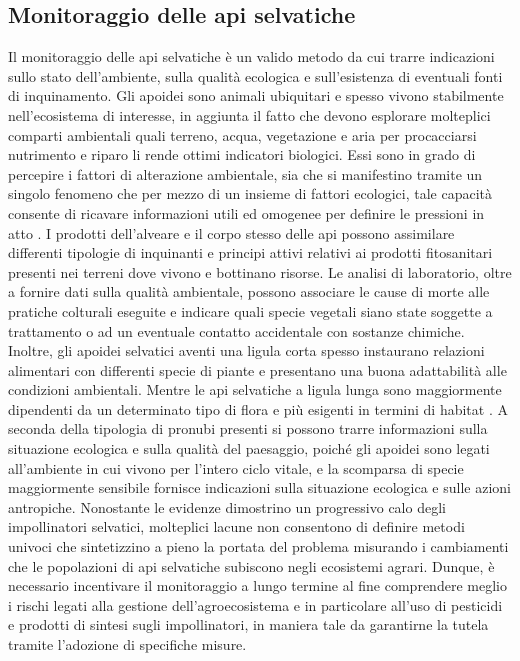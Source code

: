 \documentclass[main.tex]{subfiles}
\begin{document}
\subsection{Monitoraggio delle api selvatiche}

Il monitoraggio delle api selvatiche è un valido metodo da cui trarre indicazioni sullo stato dell’ambiente, sulla qualità ecologica e sull’esistenza di eventuali fonti di inquinamento.
Gli apoidei sono animali ubiquitari e spesso vivono stabilmente nell’ecosistema di interesse, in aggiunta il fatto che devono esplorare molteplici comparti ambientali quali terreno, acqua, vegetazione e aria per procacciarsi nutrimento e riparo li rende ottimi indicatori biologici. Essi sono in grado di percepire i fattori di alterazione ambientale, sia che si manifestino tramite un singolo fenomeno che per mezzo di un insieme di fattori ecologici, tale capacità consente di ricavare informazioni utili ed omogenee per definire le pressioni in atto \citep{atta}.
I prodotti dell’alveare e il corpo stesso delle api possono assimilare differenti tipologie di inquinanti e principi attivi relativi ai prodotti fitosanitari presenti nei terreni dove vivono e bottinano risorse. Le analisi di laboratorio, oltre a fornire dati sulla qualità ambientale, possono associare le cause di morte alle pratiche colturali eseguite e indicare quali specie vegetali siano state soggette a trattamento o ad un eventuale contatto accidentale con sostanze chimiche.
Inoltre, gli apoidei selvatici aventi una ligula corta spesso instaurano relazioni alimentari con differenti specie di piante e presentano una buona adattabilità alle condizioni ambientali. Mentre le api selvatiche a ligula lunga sono maggiormente dipendenti da un determinato tipo di flora e più esigenti in termini di habitat \citep{bianco}. A seconda della tipologia di pronubi presenti si possono trarre informazioni sulla situazione ecologica e sulla qualità del paesaggio, poiché gli apoidei sono legati all’ambiente in cui vivono per l’intero ciclo vitale, e la scomparsa di specie maggiormente sensibile fornisce indicazioni sulla situazione ecologica e sulle azioni antropiche. Nonostante le evidenze dimostrino un progressivo calo degli impollinatori selvatici, molteplici lacune non consentono di definire metodi univoci che sintetizzino a pieno la portata del problema misurando i cambiamenti che le popolazioni di api selvatiche subiscono negli ecosistemi agrari. Dunque, è necessario incentivare il monitoraggio a lungo termine al fine comprendere meglio i rischi legati alla gestione dell’agroecosistema e in particolare all’uso di pesticidi e prodotti di sintesi sugli impollinatori, in maniera tale da garantirne la tutela tramite l’adozione di specifiche misure.

\clearpage
\end{document}
